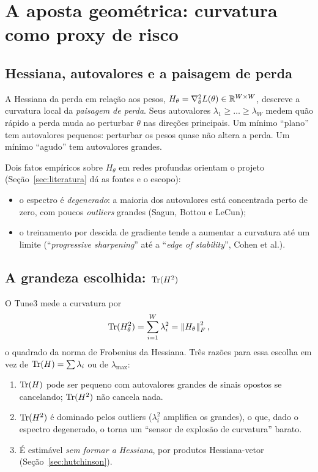 \section{A aposta geométrica: curvatura como proxy de risco}\label{sec:proxy}

\subsection{Hessiana, autovalores e a paisagem de perda}
A Hessiana da perda em relação aos pesos, $H_\theta=\nabla^2_\theta L(\theta)\in\mathbb{R}^{W\times W}$, descreve a curvatura local da \emph{paisagem de perda}. Seus autovalores $\lambda_1\ge\dots\ge\lambda_W$ medem quão rápido a perda muda ao perturbar $\theta$ nas direções principais. Um mínimo ``plano'' tem autovalores pequenos: perturbar os pesos quase não altera a perda. Um mínimo ``agudo'' tem autovalores grandes.

Dois fatos empíricos sobre $H_\theta$ em redes profundas orientam o projeto (Seção~\ref{sec:literatura} dá as fontes e o escopo):
\begin{itemize}
\item o espectro é \emph{degenerado}: a maioria dos autovalores está concentrada perto de zero, com poucos \emph{outliers} grandes (Sagun, Bottou e LeCun);
\item o treinamento por descida de gradiente tende a aumentar a curvatura até um limite (``\emph{progressive sharpening}'' até a ``\emph{edge of stability}'', Cohen et al.).
\end{itemize}

\subsection{A grandeza escolhida: \texorpdfstring{$\operatorname{Tr}(H^2)$}{Tr(H²)}}
O Tune3 mede a curvatura por
\[
\operatorname{Tr}(H_\theta^2)=\sum_{i=1}^W\lambda_i^2=\left\lVert H_\theta \right\rVert_F^2 ,
\]
o quadrado da norma de Frobenius da Hessiana. Três razões para essa escolha em vez de $\operatorname{Tr}(H)=\sum\lambda_i$ ou de $\lambda_{\max}$:
\begin{enumerate}[label=(\roman*)]
\item $\operatorname{Tr}(H)$ pode ser pequeno com autovalores grandes de sinais opostos se cancelando; $\operatorname{Tr}(H^2)$ não cancela nada.
\item $\operatorname{Tr}(H^2)$ é dominado pelos outliers ($\lambda_i^2$ amplifica os grandes), o que, dado o espectro degenerado, o torna um ``sensor de explosão de curvatura'' barato.
\item É estimável \emph{sem formar a Hessiana}, por produtos Hessiana-vetor (Seção~\ref{sec:hutchinson}).
\end{enumerate}

